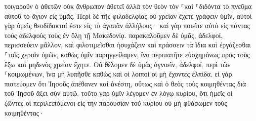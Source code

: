 \documentclass{openreader}
\begin{document}
τοιγαροῦν ὁ ἀθετῶν οὐκ ἄνθρωπον ἀθετεῖ ἀλλὰ τὸν θεὸν τὸν ⸀καὶ ⸀διδόντα τὸ πνεῦμα αὐτοῦ τὸ ἅγιον εἰς ὑμᾶς. 
Περὶ δὲ τῆς φιλαδελφίας οὐ χρείαν ἔχετε γράφειν ὑμῖν, αὐτοὶ γὰρ ὑμεῖς θεοδίδακτοί ἐστε εἰς τὸ ἀγαπᾶν ἀλλήλους· 
καὶ γὰρ ποιεῖτε αὐτὸ εἰς πάντας τοὺς ἀδελφοὺς τοὺς ἐν ὅλῃ τῇ Μακεδονίᾳ. παρακαλοῦμεν δὲ ὑμᾶς, ἀδελφοί, περισσεύειν μᾶλλον, 
καὶ φιλοτιμεῖσθαι ἡσυχάζειν καὶ πράσσειν τὰ ἴδια καὶ ἐργάζεσθαι ⸀ταῖς χερσὶν ὑμῶν, καθὼς ὑμῖν παρηγγείλαμεν, 
ἵνα περιπατῆτε εὐσχημόνως πρὸς τοὺς ἔξω καὶ μηδενὸς χρείαν ἔχητε. 
Οὐ θέλομεν δὲ ὑμᾶς ἀγνοεῖν, ἀδελφοί, περὶ τῶν ⸀κοιμωμένων, ἵνα μὴ λυπῆσθε καθὼς καὶ οἱ λοιποὶ οἱ μὴ ἔχοντες ἐλπίδα. 
εἰ γὰρ πιστεύομεν ὅτι Ἰησοῦς ἀπέθανεν καὶ ἀνέστη, οὕτως καὶ ὁ θεὸς τοὺς κοιμηθέντας διὰ τοῦ Ἰησοῦ ἄξει σὺν αὐτῷ. 
τοῦτο γὰρ ὑμῖν λέγομεν ἐν λόγῳ κυρίου, ὅτι ἡμεῖς οἱ ζῶντες οἱ περιλειπόμενοι εἰς τὴν παρουσίαν τοῦ κυρίου οὐ μὴ φθάσωμεν τοὺς κοιμηθέντας· 
\end{document}

